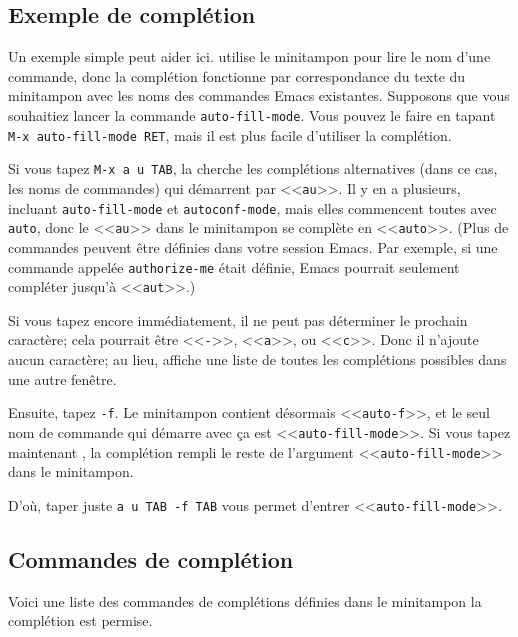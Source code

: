 \subsection{Exemple de complétion}
Un exemple simple peut aider ici.  utilise le minitampon
pour lire le nom d'une commande, donc la complétion fonctionne par
correspondance du texte du minitampon avec les noms des commandes
Emacs existantes. Supposons que vous souhaitiez lancer la commande
\texttt{auto-fill-mode}. Vous pouvez le faire en tapant \texttt{M-x
  auto-fill-mode RET}, mais il est plus facile d'utiliser la
complétion.\par

Si vous tapez \texttt{M-x a u TAB}, la \TAB cherche les
complétions alternatives (dans ce cas, les noms de commandes) qui
démarrent par <<\texttt{au}>>. Il y en a plusieurs, incluant
\texttt{auto-fill-mode} et \texttt{autoconf-mode}, mais elles
commencent toutes avec \texttt{auto}, donc le <<\texttt{au}>> dans le
minitampon se complète en <<\texttt{auto}>>. (Plus de commandes
peuvent être définies dans votre session Emacs. Par exemple, si une
commande appelée \texttt{authorize-me} était définie, Emacs pourrait
seulement compléter jusqu'à <<\texttt{aut}>>.)\par

Si vous tapez \TAB encore immédiatement, il ne peut pas
déterminer le prochain caractère; cela pourrait être <<\texttt{-}>>,
<<\texttt{a}>>, ou <<\texttt{c}>>. Donc il n'ajoute aucun caractère;
au lieu, \TAB affiche une liste de toutes les complétions
possibles dans une autre fenêtre.\par

Ensuite, tapez \texttt{-f}. Le minitampon contient désormais
<<\texttt{auto-f}>>, et le seul nom de commande qui démarre avec ça
est <<\texttt{auto-fill-mode}>>. Si vous tapez maintenant
\TAB, la complétion rempli le reste de l'argument
<<\texttt{auto-fill-mode}>> dans le minitampon. \par

D'où, taper juste \texttt{a u TAB -f TAB} vous permet d'entrer
<<\texttt{auto-fill-mode}>>. \par

\subsection{Commandes de complétion}

Voici une liste des commandes de complétions définies dans le
minitampon la complétion est permise.

